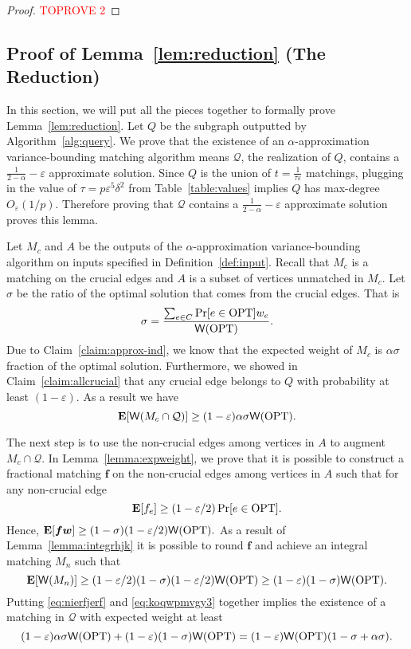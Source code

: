 \documentclass[letterpaper,11pt]{article}
\renewcommand{\epsilon}{\varepsilon}
\DeclareMathOperator{\E}{\ensuremath{\normalfont \textbf{E}}}
\newcommand{\mc}[1]{\ensuremath{\mathcal{#1}}}
\newcommand{\opt}[0]{\text{OPT}}
\newcommand{\weight}[0]{{\sf{W}}}
\renewcommand{\epsilon}[0]{\ensuremath{\varepsilon}}
\renewcommand{\mc}[1]{\ensuremath{\mathcal{#1}}}
\begin{document}
\begin{proof}\textcolor{red}{TOPROVE 2}\end{proof}

\subsection{Proof of Lemma~\ref{lem:reduction} (The Reduction)}\label{sec:reductionproof}
In this section, we will put all the pieces together to formally prove Lemma~\ref{lem:reduction}. Let $Q$ be the subgraph outputted by Algorithm~\ref{alg:query}. 
We prove that the existence of an  $\alpha$-approximation variance-bounding matching algorithm means $\mc{Q}$, the realization of $Q$, contains a $\frac{1}{2-\alpha}-\epsilon$ approximate solution. Since $Q$ is the union of $t=\frac{1}{\tau \epsilon}$ matchings, plugging in the value of $\tau={p\epsilon^5 \delta^2}$ from Table~\ref{table:values} implies $Q$ has max-degree $O_{\epsilon}(1/p)$. Therefore proving that $\mc{Q}$ contains a $\frac{1}{2-\alpha}-\epsilon$ approximate solution proves this lemma.

Let $M_c$ and $A$ be the outputs of the $\alpha$-approximation variance-bounding algorithm on inputs specified in Definition~\ref{def:input}. Recall that $M_c$ is a matching on the crucial edges and $A$ is a subset of vertices unmatched in $M_c$. Let $\sigma$ be the ratio of the optimal solution that comes from the crucial edges. That is
$$\sigma=\frac{\sum_{e\in C} \Pr[e\in \opt] w_e}{\weight(\opt) }.$$
Due to Claim~\ref{claim:approx-ind}, we know that the expected weight of $M_c$ is $\alpha\sigma$ fraction of the optimal solution. Furthermore, we showed in Claim~\ref{claim:allcrucial} that any crucial edge belongs to $Q$ with probability at least $(1-\epsilon)$. As a result we have \begin{equation}\label{eq:nierfjerf}
    \E[\weight(M_c\cap \mc{Q})]\geq (1-\epsilon)\alpha\sigma\weight(\opt).
\end{equation}

The next step is to use the non-crucial edges among vertices in $A$ to augment $M_c\cap \mc{Q}$. In Lemma~\ref{lemma:expweight}, we prove that it is possible to construct a fractional matching $\bm{f}$ on the non-crucial edges among vertices in $A$ such that for any non-crucial edge $$\E[f_e]\geq (1-\epsilon/2)\Pr[e\in \opt].$$ Hence, $\E[\bm{f}\bm{w}]\geq (1-\sigma) (1-\epsilon/2)\weight(\opt).$ As a result of Lemma~\ref{lemma:integrhjk} it is possible to round $\bm{f}$  and achieve an integral matching $M_n$ such that
\begin{equation}\label{eq:koqwpmvgy3}
   \E[\weight(M_n)]\geq (1-\epsilon/2)(1-\sigma) (1-\epsilon/2)\weight(\opt)\geq (1-\epsilon)(1-\sigma)\weight(\opt).
\end{equation}
Putting \cref{eq:nierfjerf} and \cref{eq:koqwpmvgy3} together implies the existence of a matching in $\mc{Q}$ with expected weight at least
$$(1-\epsilon)\alpha\sigma\weight(\opt)+ (1-\epsilon)(1-\sigma)\weight(\opt)  = (1-\epsilon)\weight(\opt)(1-\sigma+\alpha\sigma).$$
\end{document}
